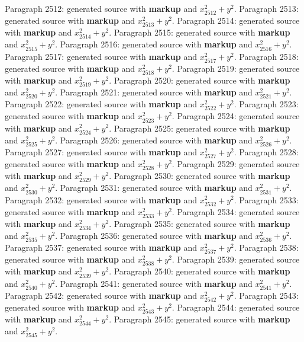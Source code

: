 \documentclass{article}
\begin{document}
Paragraph 2512: generated source with \textbf{markup} and $x_{2512}^2 + y^2$.
Paragraph 2513: generated source with \textbf{markup} and $x_{2513}^2 + y^2$.
Paragraph 2514: generated source with \textbf{markup} and $x_{2514}^2 + y^2$.
Paragraph 2515: generated source with \textbf{markup} and $x_{2515}^2 + y^2$.
Paragraph 2516: generated source with \textbf{markup} and $x_{2516}^2 + y^2$.
Paragraph 2517: generated source with \textbf{markup} and $x_{2517}^2 + y^2$.
Paragraph 2518: generated source with \textbf{markup} and $x_{2518}^2 + y^2$.
Paragraph 2519: generated source with \textbf{markup} and $x_{2519}^2 + y^2$.
Paragraph 2520: generated source with \textbf{markup} and $x_{2520}^2 + y^2$.
Paragraph 2521: generated source with \textbf{markup} and $x_{2521}^2 + y^2$.
Paragraph 2522: generated source with \textbf{markup} and $x_{2522}^2 + y^2$.
Paragraph 2523: generated source with \textbf{markup} and $x_{2523}^2 + y^2$.
Paragraph 2524: generated source with \textbf{markup} and $x_{2524}^2 + y^2$.
Paragraph 2525: generated source with \textbf{markup} and $x_{2525}^2 + y^2$.
Paragraph 2526: generated source with \textbf{markup} and $x_{2526}^2 + y^2$.
Paragraph 2527: generated source with \textbf{markup} and $x_{2527}^2 + y^2$.
Paragraph 2528: generated source with \textbf{markup} and $x_{2528}^2 + y^2$.
Paragraph 2529: generated source with \textbf{markup} and $x_{2529}^2 + y^2$.
Paragraph 2530: generated source with \textbf{markup} and $x_{2530}^2 + y^2$.
Paragraph 2531: generated source with \textbf{markup} and $x_{2531}^2 + y^2$.
Paragraph 2532: generated source with \textbf{markup} and $x_{2532}^2 + y^2$.
Paragraph 2533: generated source with \textbf{markup} and $x_{2533}^2 + y^2$.
Paragraph 2534: generated source with \textbf{markup} and $x_{2534}^2 + y^2$.
Paragraph 2535: generated source with \textbf{markup} and $x_{2535}^2 + y^2$.
Paragraph 2536: generated source with \textbf{markup} and $x_{2536}^2 + y^2$.
Paragraph 2537: generated source with \textbf{markup} and $x_{2537}^2 + y^2$.
Paragraph 2538: generated source with \textbf{markup} and $x_{2538}^2 + y^2$.
Paragraph 2539: generated source with \textbf{markup} and $x_{2539}^2 + y^2$.
Paragraph 2540: generated source with \textbf{markup} and $x_{2540}^2 + y^2$.
Paragraph 2541: generated source with \textbf{markup} and $x_{2541}^2 + y^2$.
Paragraph 2542: generated source with \textbf{markup} and $x_{2542}^2 + y^2$.
Paragraph 2543: generated source with \textbf{markup} and $x_{2543}^2 + y^2$.
Paragraph 2544: generated source with \textbf{markup} and $x_{2544}^2 + y^2$.
Paragraph 2545: generated source with \textbf{markup} and $x_{2545}^2 + y^2$.
\end{document}
